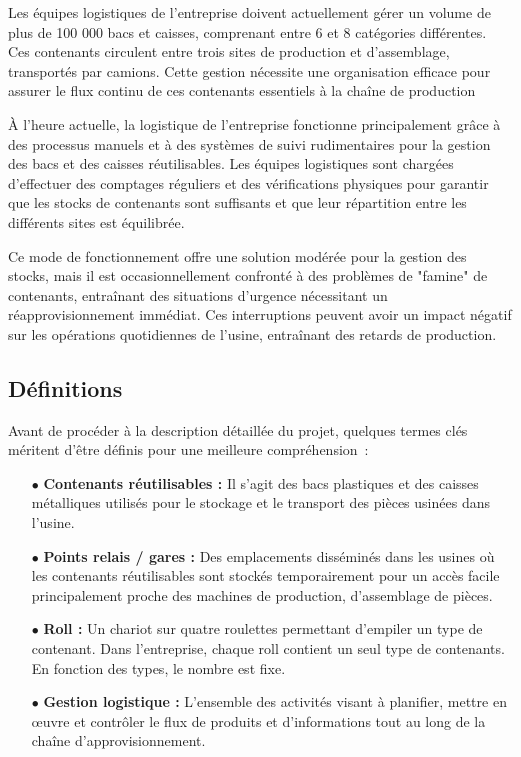 Les équipes logistiques de l'entreprise doivent actuellement gérer un
volume de plus de 100 000 bacs et caisses, comprenant entre 6 et 8
catégories différentes. Ces contenants circulent entre trois sites de
production et d'assemblage, transportés par camions. Cette gestion
nécessite une organisation efficace pour assurer le flux continu de
ces contenants essentiels à la chaîne de production


À l'heure actuelle, la logistique de l'entreprise fonctionne
principalement grâce à des processus manuels et à des systèmes de
suivi rudimentaires pour la gestion des bacs et des caisses
réutilisables. Les équipes logistiques sont chargées d'effectuer des
comptages réguliers et des vérifications physiques pour garantir que
les stocks de contenants sont suffisants et que leur répartition entre
les différents sites est équilibrée.


Ce mode de fonctionnement offre une solution modérée pour la gestion
des stocks, mais il est occasionnellement confronté à des problèmes de
"famine" de contenants, entraînant des situations d'urgence
nécessitant un réapprovisionnement immédiat. Ces interruptions peuvent
avoir un impact négatif sur les opérations quotidiennes de l'usine,
entraînant des retards de production.

\subsection{Définitions}

Avant de procéder à la description détaillée du projet, quelques termes clés méritent d'être définis pour une meilleure compréhension~:\\

\begin{itemize}
\item[$\bullet$] \textbf{Contenants réutilisables :} Il s'agit des
  bacs plastiques et des caisses métalliques utilisés pour le stockage
  et le transport des pièces usinées dans l'usine.
\item[$\bullet$] \textbf{Points relais / gares :} Des emplacements
  disséminés dans les usines où les contenants réutilisables sont
  stockés temporairement pour un accès facile principalement proche
  des machines de production, d'assemblage de pièces.
\item[$\bullet$] \textbf{Roll :} Un chariot sur quatre roulettes
  permettant d'empiler un type de contenant. Dans l'entreprise, chaque
  roll contient un seul type de contenants. En fonction des types, le
  nombre est fixe.
\item[$\bullet$] \textbf{Gestion logistique :} L'ensemble des
  activités visant à planifier, mettre en œuvre et contrôler le flux
  de produits et d'informations tout au long de la chaîne
  d'approvisionnement.
\end{itemize}
